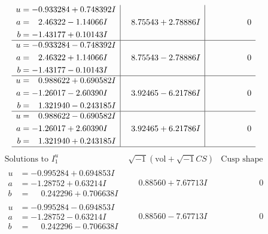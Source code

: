 \documentclass[1p]{elsarticle_modified}
\theoremstyle{definition}
\newcommand{\I}{\sqrt{-1}}
\begin{document}
$$\begin{array}{c|c|c}
\begin{aligned}
u &= -0.933284 + 0.748392 I \\
a &= \phantom{-}2.46322 - 1.14066 I \\
b &= -1.43177 + 0.10143 I\end{aligned}
 & \phantom{-}8.75543 + 2.78886 I & \phantom{-0.000000 } 0 \\ \hline\begin{aligned}
u &= -0.933284 - 0.748392 I \\
a &= \phantom{-}2.46322 + 1.14066 I \\
b &= -1.43177 - 0.10143 I\end{aligned}
 & \phantom{-}8.75543 - 2.78886 I & \phantom{-0.000000 } 0 \\ \hline\begin{aligned}
u &= \phantom{-}0.988622 + 0.690582 I \\
a &= -1.26017 - 2.60390 I \\
b &= \phantom{-}1.321940 - 0.243185 I\end{aligned}
 & \phantom{-}3.92465 - 6.21786 I & \phantom{-0.000000 } 0 \\ \hline\begin{aligned}
u &= \phantom{-}0.988622 - 0.690582 I \\
a &= -1.26017 + 2.60390 I \\
b &= \phantom{-}1.321940 + 0.243185 I\end{aligned}
 & \phantom{-}3.92465 + 6.21786 I & \phantom{-0.000000 } 0\\
 \hline 
 \end{array}$$\newpage$$\begin{array}{c|c|c}  
\text{Solutions to }I^u_{1}& \I (\text{vol} + \sqrt{-1}CS) & \text{Cusp shape}\\
 \hline 
\begin{aligned}
u &= -0.995284 + 0.694853 I \\
a &= -1.28752 + 0.63214 I \\
b &= \phantom{-}0.242296 + 0.706638 I\end{aligned}
 & \phantom{-}0.88560 + 7.67713 I & \phantom{-0.000000 } 0 \\ \hline\begin{aligned}
u &= -0.995284 - 0.694853 I \\
a &= -1.28752 - 0.63214 I \\
b &= \phantom{-}0.242296 - 0.706638 I\end{aligned}
 & \phantom{-}0.88560 - 7.67713 I & \phantom{-0.000000 } 0 \\ \hline\begin{aligned}

\end{aligned}
\end{array}$$
\end{document}
